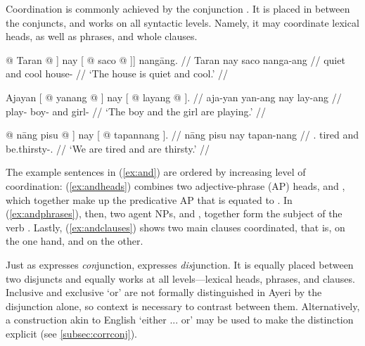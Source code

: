 
Coordination is commonly achieved by the conjunction . It is
placed in between the conjuncts, and works on all syntactic levels. Namely, it
may coordinate lexical heads, as well as phrases, and whole clauses.

\pex\label{ex:and}
\a\label{ex:andheads}\begingl
	\gla {\normalfont [\tsup{AP}[\tsup{A}} @ Taran @ {\normalfont ]} nay 
		{\normalfont [} @ saco @ {\normalfont ]]} nangāng. //
	\glb {} Taran {} nay {} saco {} nanga-ang //
	\glc {} quiet {} and {} cool {} house-\Aarg{} //
	\glft `The house is quiet and cool.' //
\endgl

\a\label{ex:andphrases}\begingl
	\gla Ajayan {\normalfont [} @ yanang @ {\normalfont ]} nay 
{\normalfont [} @ layang @ {\normalfont ].} //
	\glb aja-yan {} yan-ang {} nay {} lay-ang {} //
	\glc play-\TplM{} {} boy-\Aarg{} {} and {} girl-\Aarg{} {} //
	\glft `The boy and the girl are playing.' //
\endgl

\a\label{ex:andclauses}\begingl
	\gla {\normalfont [\tsup{S}} @ nāng pisu @ {\normalfont ]} nay 
{\normalfont [} @ tapannang {\normalfont ].} //
	\glb {} nāng pisu {} nay {} tapan-nang {} //
	\glc {} \Fpl{}.\Aarg{} tired {} and {} be.thirsty-\Fpl{}.\Aarg{} {} //
	\glft `We are tired and are thirsty.' //
\endgl

\xe

The example sentences in (\ref{ex:and}) are ordered by increasing level of
coordination: (\ref{ex:andheads}) combines two adjective-phrase (AP) heads,
 and , which together make up
the predicative AP that is equated to . In
(\ref{ex:andphrases}), then, two agent NPs,  and
, together form the subject of the verb
. Lastly, (\ref{ex:andclauses}) shows two main
clauses coordinated, that is,  on the
one hand, and  on the other.



Just as  expresses \emph{con}junction,  
expresses \emph{dis}junction. It is equally placed between two disjuncts and 
equally works at all levels---lexical heads, phrases, and clauses. Inclusive 
and exclusive `or' are not formally distinguished in Ayeri by the disjunction 
 alone, so context is necessary to contrast between them. 
Alternatively, a construction akin to English `either ... or' may be used to 
make the distinction explicit (see \autoref{subsec:corrconj}).

